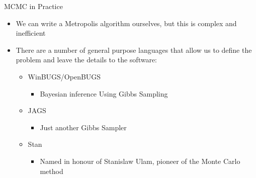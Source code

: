 \documentclass[
  ignorenonframetext,
  aspectratio=169,
]{beamer}
\providecommand{\tightlist}{%
  \setlength{\itemsep}{0pt}\setlength{\parskip}{0pt}}
\begin{document}
\begin{frame}{MCMC in Practice}
\protect\hypertarget{mcmc-in-practice}{}
\begin{itemize}
\item
  We can write a Metropolis algorithm ourselves, but this is complex and
  inefficient
\item
  There are a number of general purpose languages that allow us to
  define the problem and leave the details to the software:

  \begin{itemize}
  \tightlist
  \item
    WinBUGS/OpenBUGS

    \begin{itemize}
    \tightlist
    \item
      Bayesian inference Using Gibbs Sampling
    \end{itemize}
  \item
    JAGS

    \begin{itemize}
    \tightlist
    \item
      Just another Gibbs Sampler
    \end{itemize}
  \item
    Stan

    \begin{itemize}
    \tightlist
    \item
      Named in honour of Stanislaw Ulam, pioneer of the Monte Carlo
      method
    \end{itemize}
  \end{itemize}
\end{itemize}
\end{frame}
\end{document}
